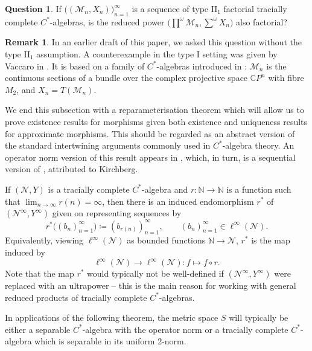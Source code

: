 \documentclass[a4paper,11pt]{amsart}
\theoremstyle{definition}
\newtheorem{question}[theorem]{Question}
\newtheorem{remark}[theorem]{Remark}
\numberwithin{equation}{section}
\numberwithin{theorem}{section}
\newcommand{\M}{\mathcal{M}}
\begin{document}
\begin{question}
	If $\big((\M_n, X_n)\big)_{n=1}^\infty$ is a sequence of type II$_1$ factorial tracially complete $C^*$-algebras, is the reduced power $\big(\prod^\omega \M_n, \sum^\omega X_n\big)$ also factorial?
\end{question}

\begin{remark}\label{VaccaroRemark}
In an earlier draft of this paper, we asked this question without the type II$_1$ assumption.  A counterexample in the type I setting was given by Vaccaro in \cite{Va23}.  It is based on a family of $C^*$-algebras introduced in \cite{PP70}: $\M_n$ is the continuous  sections of a bundle over the complex projective space $\mathbb C P^n$ with fibre $M_2$, and $X_n = T(\M_n)$.
\end{remark}
 
We end this subsection with a reparameterisation theorem which will allow us to prove existence results for morphisms given both existence and uniqueness results for approximate morphisms.  This should be regarded as an abstract version of the standard intertwining arguments commonly used in $C^*$-algebra theory.  An operator norm version of this result appears in \cite[Theorem~4.3]{Gabe18}, which, in turn, is a sequential version of \cite[Proposition~1.3.7]{Phillips00}, attributed to Kirchberg.  

If $(\mathcal N, Y)$ is a tracially complete $C^*$-algebra and $r \colon \mathbb N \rightarrow \mathbb N$ is a function such that $\lim_{n \rightarrow \infty} r(n) = \infty$, then there is an induced endomorphism $r^*$ of $(\mathcal N^\infty, Y^\infty)$ given on representing sequences by
\begin{equation}
  r^*\big((b_n)_{n=1}^\infty) \coloneqq (b_{r(n)})_{n=1}^\infty, \qquad (b_n)_{n=1}^\infty \in \ell^\infty(\mathcal N).
\end{equation}
Equivalently, viewing $\ell^\infty(\mathcal N)$ as bounded functions $\mathbb N \rightarrow \mathcal N$, $r^*$ is the map induced by
\begin{equation}
	\ell^\infty(\mathcal N) \rightarrow \ell^\infty(\mathcal N) \colon f \mapsto f \circ r.
\end{equation}
Note that the map $r^*$ would typically not be well-defined if $(\mathcal N^\infty, Y^\infty)$ were replaced with an ultrapower -- this is the main reason for working with general reduced products of tracially complete $C^*$-algebras.

In applications of the following theorem, the metric space $S$ will typically be either a separable $C^*$-algebra with the operator norm or a tracially complete $C^*$-algebra which is separable in its uniform 2-norm.
\end{document}
